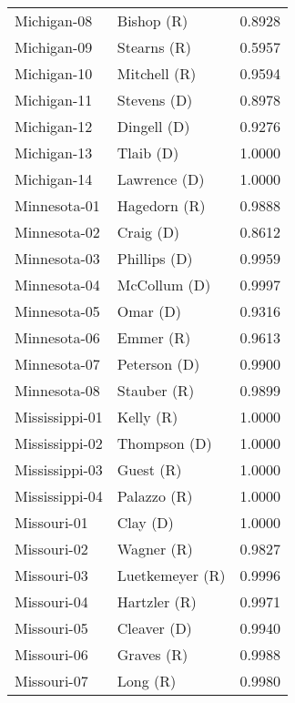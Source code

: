 \begin{longtable}{llr}
       Michigan-08 &           Bishop (R) &       0.8928 \\
       Michigan-09 &          Stearns (R) &       0.5957 \\
       Michigan-10 &         Mitchell (R) &       0.9594 \\
       Michigan-11 &          Stevens (D) &       0.8978 \\
       Michigan-12 &          Dingell (D) &       0.9276 \\
       Michigan-13 &            Tlaib (D) &       1.0000 \\
       Michigan-14 &         Lawrence (D) &       1.0000 \\
      Minnesota-01 &         Hagedorn (R) &       0.9888 \\
      Minnesota-02 &            Craig (D) &       0.8612 \\
      Minnesota-03 &         Phillips (D) &       0.9959 \\
      Minnesota-04 &         McCollum (D) &       0.9997 \\
      Minnesota-05 &             Omar (D) &       0.9316 \\
      Minnesota-06 &            Emmer (R) &       0.9613 \\
      Minnesota-07 &         Peterson (D) &       0.9900 \\
      Minnesota-08 &          Stauber (R) &       0.9899 \\
    Mississippi-01 &            Kelly (R) &       1.0000 \\
    Mississippi-02 &         Thompson (D) &       1.0000 \\
    Mississippi-03 &            Guest (R) &       1.0000 \\
    Mississippi-04 &          Palazzo (R) &       1.0000 \\
       Missouri-01 &             Clay (D) &       1.0000 \\
       Missouri-02 &           Wagner (R) &       0.9827 \\
       Missouri-03 &      Luetkemeyer (R) &       0.9996 \\
       Missouri-04 &         Hartzler (R) &       0.9971 \\
       Missouri-05 &          Cleaver (D) &       0.9940 \\
       Missouri-06 &           Graves (R) &       0.9988 \\
       Missouri-07 &             Long (R) &       0.9980 \\

\end{longtable}
